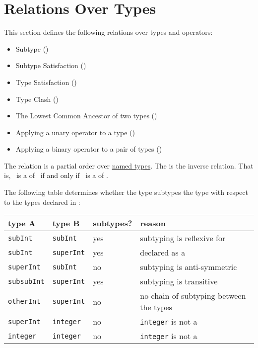 \section{Relations Over Types\label{sec:RelationsOnTypes}}
This section defines the following relations over types and operators:
\begin{itemize}
  \item Subtype ()
  \item Subtype Satisfaction ()
  \item Type Satisfaction ()
  \item Type Clash ()
  \item The Lowest Common Ancestor of two types ()
  \item Applying a unary operator to a type ()
  \item Applying a binary operator to a pair of types ()
\end{itemize}

\hypertarget{def-supertypeterm}{}
The \emph{\subtypeterm} relation is a partial order over \underline{named types}.
The \emph{\supertypeterm} is the inverse relation.
That is, \tty\ is a \supertypeterm{} of \tsy\ if and only if \tsy\ is a \subtypeterm{} of \tty.

The following table determines whether the type \vAbf{}
subtypes the type \vBbf{} with respect to the types
declared in :\\
\begin{tabular}{llll}
  \textbf{type A} & \textbf{type B}   & \textbf{subtypes?}  & \textbf{reason}\\
\hline
  \texttt{subInt}     & \texttt{subInt}   & yes             & subtyping is reflexive for \namedtypesterm{}\\
  \texttt{subInt}     & \texttt{superInt} & yes             & declared as a \subtypeterm{}\\
  \texttt{superInt}   & \texttt{subInt}   & no              & subtyping is anti-symmetric\\
  \texttt{subsubInt}  & \texttt{superInt} & yes             & subtyping is transitive\\
  \texttt{otherInt}   & \texttt{superInt} & no              & no chain of subtyping between the types\\
  \texttt{superInt}   & \texttt{integer}  & no              & \texttt{integer} is not a \namedtypeterm{}\\
  \texttt{integer}    & \texttt{integer}  & no              & \texttt{integer} is not a \namedtypeterm{}\\
\end{tabular}

